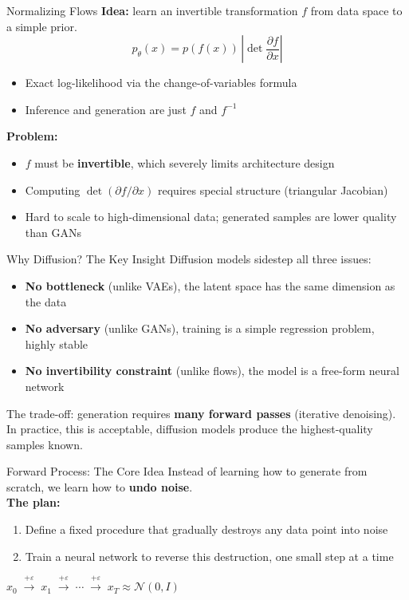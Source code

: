 \documentclass[10pt, aspectratio=169]{beamer}
\begin{document}
\begin{frame}{Normalizing Flows}
  \textbf{Idea:} learn an invertible transformation $f$ from data space to a simple prior.
  \[
    p_\theta(x) = p(f(x))\,\left|\det \frac{\partial f}{\partial x}\right|
  \]
  \begin{itemize}
    \item Exact log-likelihood via the change-of-variables formula
    \item Inference and generation are just $f$ and $f^{-1}$
  \end{itemize}
  \textbf{Problem:}
  \begin{itemize}
    \item $f$ must be \textbf{invertible}, which severely limits architecture design
    \item Computing $\det(\partial f/\partial x)$ requires special structure (triangular Jacobian)
    \item Hard to scale to high-dimensional data; generated samples are lower quality than GANs
  \end{itemize}
\end{frame}

\begin{frame}{Why Diffusion? The Key Insight}
  Diffusion models sidestep all three issues:
  \begin{itemize}
    \item \textbf{No bottleneck} (unlike VAEs), the latent space has the same dimension as the data
    \item \textbf{No adversary} (unlike GANs), training is a simple regression problem, highly stable
    \item \textbf{No invertibility constraint} (unlike flows), the model is a free-form neural network
  \end{itemize}
  \vspace{8pt}
  The trade-off: generation requires \textbf{many forward passes} (iterative denoising).\\[6pt]
  In practice, this is acceptable, diffusion models produce the highest-quality samples known.
\end{frame}


\begin{frame}{Forward Process: The Core Idea}
  Instead of learning how to generate from scratch, we learn how to \textbf{undo noise}.\\[10pt]
  \textbf{The plan:}
  \begin{enumerate}
    \item Define a fixed procedure that gradually destroys any data point into noise
    \item Train a neural network to reverse this destruction, one small step at a time
  \end{enumerate}
  \vspace{10pt}
  \begin{center}
    \large
    $x_0 \;\xrightarrow{+\varepsilon}\; x_1 \;\xrightarrow{+\varepsilon}\; \cdots \;\xrightarrow{+\varepsilon}\; x_T \approx \mathcal{N}(0,I)$
  \end{center}
\end{frame}
\end{document}
